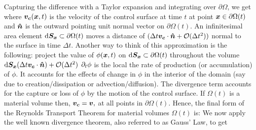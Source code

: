 Capturing the difference with a Taylor expansion and integrating over $\partial\Omega$, we get
where $\boldsymbol{v_c}(\boldsymbol{x},t)$ is the velocity of the control surface at time $t$ at point $\boldsymbol{x}\in\partial\Omega(t)$ and $\boldsymbol{\hat{n}}$ is the outward pointing unit normal vector on $\partial\Omega(t)$. An infinitesimal area element $\mathrm{d} \boldsymbol{S_x}\subset\partial\Omega(t)$ moves a distance of $(\Delta t\boldsymbol{v_c}\cdot\boldsymbol{\hat{n}}+\mathcal{O}(\Delta t^2))$ normal to the surface in time $\Delta t.$ Another way to think of this approximation is the following: project the value of $\phi(\boldsymbol{x},t)$ on $\mathrm{d} \boldsymbol{S_x}\subset\partial\Omega(t)$ throughout the volume $\mathrm{d} \boldsymbol{S_x}(\Delta t\boldsymbol{v_c}\cdot\boldsymbol{\hat{n}})+\mathcal{O}(\Delta t^2)$
$\partial_{t}\phi$ is the local the rate of production (or accumulation) of $\phi.$ It accounts for the effects of change in $\phi$ in the interior of the domain (say due to creation/dissipation or advection/diffusion). The divergence term accounts for the capture or loss of $\phi$ by the motion of the control surface. If $\Omega(t)$ is a material volume then, $\boldsymbol{v_c}=\boldsymbol{v},$ at all points in $\partial\Omega(t)$. Hence, the final form of the Reynolds Transport Theorem for material volumes $\Omega(t)$ is:
We now apply the well known divergence theorem, also referred to as Gauss' Law,
to get

